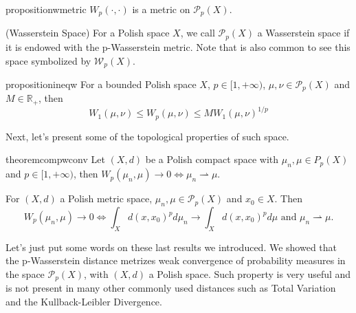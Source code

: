 \begin{restatable}{proposition}{wmetric}
  $W_p(\cdot,\cdot)$ is a metric on $\mathcal P_p(X)$.
\end{restatable}

\begin{definition} (Wasserstein Space)
  For a Polish space $X$, we call $\mathcal P_p(X)$ a Wasserstein space if it is endowed with
  the p-Wasserstein metric. Note that is also common to see this space symbolized by $\mathcal W_p(X)$.
\end{definition}

\begin{restatable}{proposition}{ineqw}
  For a bounded Polish space $X$, $p \in [1,+\infty)$, $\mu,\nu \in \mathcal P_p(X)$ and $M\in \mathbb R_+$, then
  \begin{equation}
    W_1(\mu,\nu) \leq W_p(\mu,\nu) \leq MW_1(\mu,\nu)^{1/p}
  \end{equation}
  \label{prop:ineqwasserstein}
\end{restatable}

Next, let's present some of the topological properties of such space.

\begin{restatable}{theorem}{compwconv}
  Let $(X,d)$ be a Polish compact space with $\mu_n,\mu \in P_p(X)$ and
  $p \in [1,+\infty)$, then $W_p(\mu_n,\mu)\to 0 \iff \mu_n \rightharpoonup \mu$.
  \label{thm:compactwassersteinconv}
\end{restatable}


\begin{theorem}

  For $(X,d)$ a Polish metric space, $\mu_n,\mu \in \mathcal P_p(X)$ and $x_0 \in X$. Then
  \begin{equation}
    W_p(\mu_n,\mu) \to 0 \iff \int_X d(x,x_0)^p d\mu_n \to \int_X d(x,x_0)^p d\mu
    \text{ and } \mu_n \rightharpoonup \mu.
  \end{equation}
  \label{thm:polishwmetrize}
\end{theorem}

Let's just put some words on these last results we introduced.
We showed that the p-Wasserstein distance metrizes weak convergence
of probability measures in the space $\mathcal P_p(X)$, with $(X,d)$ a Polish space.
Such property is very useful and is not present in many other commonly used distances such as
Total Variation and the Kullback-Leibler Divergence.

